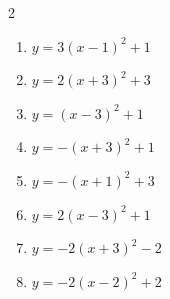 \documentclass[b5paper,10pt]{ltjsarticle}
\begin{document}
\begin{multicols}{ 2 }
\begin{enumerate}
\vspace{170pt}\item $\displaystyle{} y= 3\left( x-1\right)^{2}+1$

\vspace{170pt}\item $\displaystyle{} y= 2\left( x+3\right)^{2}+3$

\vspace{170pt}\item $\displaystyle{} y= \left( x-3\right)^{2}+1$

\vspace{170pt}\item $\displaystyle{} y= -\left( x+3\right)^{2}+1$

\vspace{170pt}\item $\displaystyle{} y= -\left( x+1\right)^{2}+3$

\vspace{170pt}\item $\displaystyle{} y= 2\left( x-3\right)^{2}+1$

\vspace{170pt}\item $\displaystyle{} y= -2\left( x+3\right)^{2}-2$

\vspace{170pt}\item $\displaystyle{} y= -2\left( x-2\right)^{2}+2$

\vspace{170pt}\end{enumerate}
\end{multicols}
\newpage
\end{document}

